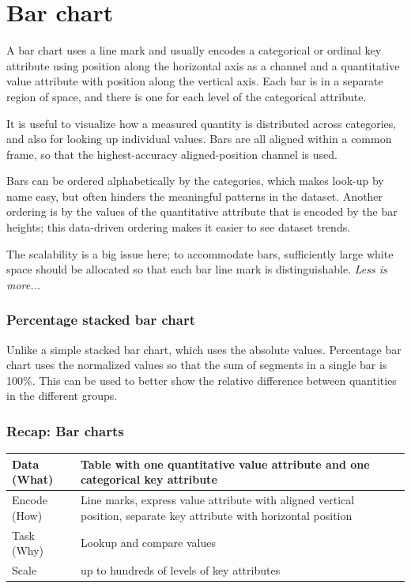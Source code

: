 \section{Bar chart}
A bar chart uses a line mark and usually encodes a categorical or ordinal key attribute using position along the horizontal axis as a channel and a quantitative value attribute with position along the vertical axis. Each bar is in a separate region of space, and there is one for each level of the categorical attribute.\par
It is useful to visualize how a measured quantity is distributed across categories, and also for looking up individual values. Bars are all aligned within a common frame, so that the highest-accuracy aligned-position channel is used.\par
Bars can be ordered alphabetically by the categories, which makes look-up by name easy, but often hinders the meaningful patterns in the dataset. Another ordering is by the values of the quantitative attribute that is encoded by the bar heights; this data-driven ordering makes it easier to see dataset trends. \par
The scalability is a big issue here; to accommodate bars, sufficiently large white space should be allocated so that each bar line mark is distinguishable. \textit{Less is more...}

\subsubsection{Percentage stacked bar chart}
Unlike a simple stacked bar chart, which uses the absolute values. Percentage bar chart uses the normalized values so that the sum of segments in a single bar is 100\%. This can be used to better show the relative difference between quantities in the different groups.

\subsubsection{Recap: Bar charts}
\begin{tabularx}{0.8\textwidth} { 
  | >{\raggedright\arraybackslash}l 
  | >{\raggedright\arraybackslash}X | }
    \hline
    Data (What) & Table with one quantitative value attribute and one categorical key attribute \\
    \hline
    Encode (How) & Line marks, express value attribute with aligned vertical position, separate key attribute with horizontal position \\
    \hline
    Task (Why) & Lookup and compare values\\
    \hline
    Scale &  up to hundreds of levels of key attributes\\
    \hline
\end{tabularx}

